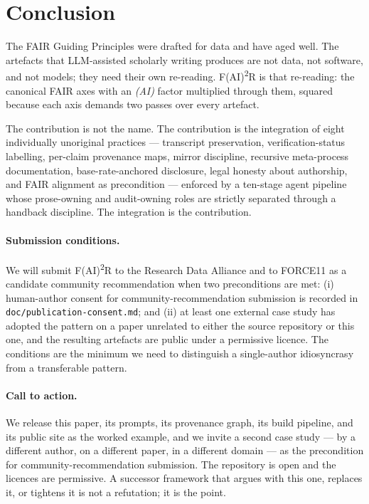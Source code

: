 \section{Conclusion}
\label{sec:conclusion}

The FAIR Guiding Principles were drafted for data and have aged
well. The artefacts that LLM-assisted scholarly writing produces are
not data, not software, and not models; they need their own
re-reading. F(AI)\textsuperscript{2}R is that re-reading: the
canonical FAIR axes with an \emph{(AI)} factor multiplied through
them, squared because each axis demands two passes over every
artefact.

The contribution is not the name. The contribution is the
integration of eight individually unoriginal practices ---
transcript preservation, verification-status labelling, per-claim
provenance maps, mirror discipline, recursive meta-process
documentation, base-rate-anchored disclosure, legal honesty about
authorship, and FAIR alignment as precondition --- enforced by a
ten-stage agent pipeline whose prose-owning and audit-owning roles
are strictly separated through a handback discipline. The
integration is the contribution.

\paragraph{Submission conditions.}
We will submit F(AI)\textsuperscript{2}R to the Research Data
Alliance and to FORCE11 as a candidate community recommendation
when two preconditions are met: (i) human-author consent for
community-recommendation submission is recorded in
\texttt{doc/publication-consent.md}; and (ii) at least one external
case study has adopted the pattern on a paper unrelated to either
the source repository or this one, and the resulting artefacts are
public under a permissive licence. The conditions are the minimum
we need to distinguish a single-author idiosyncrasy from a
transferable pattern.

\paragraph{Call to action.}
We release this paper, its prompts, its provenance graph, its build
pipeline, and its public site as the worked example, and we invite
a second case study --- by a different author, on a different
paper, in a different domain --- as the precondition for
community-recommendation submission. The repository is open and
the licences are permissive. A successor framework that argues
with this one, replaces it, or tightens it is not a refutation; it
is the point.


